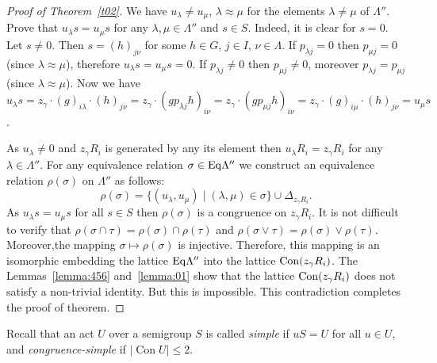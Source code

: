 \documentclass{birkau}
\numberwithin{equation}{section}
\theoremstyle{plain}
\theoremstyle{definition}
\DeclareMathOperator{\Con}{Con}
\begin{document}
\begin{proof}[Proof of Theorem~\ref{t02}]
        We have $u_\lambda \ne u_\mu$, $\lambda \approx \mu$ for the elements $\lambda \ne \mu$ of $\Lambda''$. Prove that $u_\lambda s=u_\mu s$ for any $\lambda, \mu \in \Lambda''$ and $s\in S$. Indeed, it is clear for $s=0$. Let $s\ne 0$. Then $s=(h)_{j\nu}$ for some $h\in G$, $j\in I$, $\nu \in \Lambda$. If $p_{\lambda j}=0$ then $p_{\mu j}=0$ (since $\lambda \approx \mu$), therefore $u_\lambda s=u_\mu s=0$. If $p_{\lambda j}\ne 0$ then $p_{\mu j} \ne 0$, moreover $p_{\lambda j}=p_{\mu j}$ (since $\lambda \approx \mu$). Now we have $u_\lambda s=z_\gamma\cdot (g)_{i\lambda} \cdot (h)_{j\nu} = z_\gamma\cdot (gp_{\lambda j}h)_{i\nu} = z_\gamma \cdot (gp_{\mu j}h)_{i\nu} = z_\gamma \cdot (g)_{i\mu} \cdot (h)_{j\nu} =u_\mu s$.

        As $u_\lambda \ne 0$ and $z_\gamma R_i$ is generated by any its element then $u_\lambda R_i = z_\gamma R_i$ for any $\lambda \in \Lambda''$. For any equivalence relation $\sigma \in {\rm Eq}\Lambda''$ we construct an equivalence relation $\rho(\sigma)$ on $\Lambda''$ as follows: $$ \rho(\sigma)=\{ (u_\lambda,u_\mu) \mid (\lambda,\mu)\in \sigma \} \cup \Delta_{z_\gamma R_i}.  $$ As $u_\lambda s=u_\mu s$ for all $s\in S$ then $\rho(\sigma)$ is a congruence on $z_\gamma R_i$. It is not difficult to verify that $\rho (\sigma \cap \tau) =\rho(\sigma) \cap \rho(\tau)$ and $\rho (\sigma \vee \tau) =\rho(\sigma) \vee \rho(\tau)$. Moreover,the mapping $\sigma \mapsto \rho(\sigma)$ is injective. Therefore, this mapping is an isomorphic embedding the lattice ${\rm Eq}\Lambda''$ into the lattice ${\rm Con}(z_\gamma R_i)$.   The Lemmas~\ref{lemma:456} and~\ref{lemma:01} show that the lattice ${\rm Con}(z_\gamma R_i)$ does not satisfy a non-trivial identity. But this is impossible. This contradiction completes the proof of theorem.
	\end{proof}
	
	Recall that an act $U$ over a semigroup $S$ is called \textit{simple} if $uS = U$ for all $ u \in U$, and \textit{congruence-simple} if $|\Con U| \leqslant 2$.
	
\end{document}
